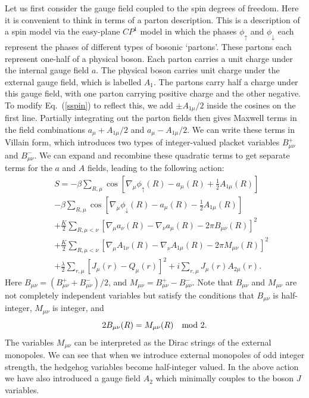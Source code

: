 \documentclass[prb,twocolumn]{revtex4-1}
\newcommand{\cp}{$CP^1$ }
\begin{document}
Let us first consider the gauge field coupled to the spin degrees of freedom. Here it is convenient to think in terms of a parton description. This is a description of a spin model via the easy-plane \cp model in which the phases $\phi_\uparrow$ and $\phi_\downarrow$ each represent the phases of different types of bosonic `partons'. These partons each represent one-half of a physical boson. Each parton carries a unit charge under the internal gauge field $a$. The physical boson carries unit charge under the external gauge field, which is labelled $A_1$. The partons carry half a charge under this gauge field, with one parton carrying positive charge and the other negative.
To modify Eq.~(\ref{sspin}) to reflect this, we add $\pm A_{1\mu}/2$ inside the cosines on the first line. 
Partially integrating out the parton fields then gives Maxwell terms in the field combinations $a_\mu+A_{1\mu}/2$ and $a_\mu-A_{1\mu}/2$. We can write these terms in Villain form, which introduces two types of integer-valued placket variables $B^+_{\mu\nu}$ and $B^-_{\mu\nu}$. We can expand and recombine these quadratic terms to get separate terms for the $a$ and $A$ fields, leading to the following action:
\begin{eqnarray}
&&S=-\beta\sum_{R,\mu} \cos[\nabla_\mu\phi_\uparrow(R)-a_\mu(R)+\frac{1}{2}A_{1\mu}(R)]\nonumber\\
&&-\beta\sum_{R,\mu} \cos[\nabla_\mu\phi_\downarrow(R)-a_\mu(R)-\frac{1}{2}A_{1\mu}(R)]\nonumber\\
&&+\frac{K}{2}\sum_{R,\mu<\nu}\left[\nabla_\mu a_\nu(R)-\nabla_\nu a_\mu(R)-2\pi B_{\mu\nu}(R)\right]^2\nonumber\\
&&+\frac{K}{2}\sum_{R,\mu<\nu}\left[\nabla_\mu A_{1\nu}(R)-\nabla_\nu A_{1\mu}(R)-2\pi M_{\mu\nu}(R)\right]^2\nonumber\\
&&+\frac{\lambda}{2}\sum_{r,\mu} [ J_\mu(r)- Q_\mu(r)]^2+i\sum_{r,\mu}J_{\mu}(r)A_{2\mu}(r).
\label{withA}
\end{eqnarray}
Here $B_{\mu\nu}=(B^+_{\mu\nu}+B^-_{\mu\nu})/2$, and $M_{\mu\nu}=B^+_{\mu\nu}-B^-_{\mu\nu}$. Note that $B_{\mu\nu}$ and $M_{\mu\nu}$ are not completely independent variables but satisfy the conditions that $B_{\mu\nu}$ is half-integer, $M_{\mu\nu}$ is integer, and 
\begin{equation}
2B_{\mu\nu}(R)=M_{\mu\nu}(R) ~~~{\rm mod}~2. 
\label{constraint}
\end{equation}
The variables $M_{\mu\nu}$ can be interpreted as the Dirac strings of the external monopoles. 
We can see that when we introduce external monopoles of odd integer strength, the hedgehog variables become half-integer valued. 
In the above action we have also introduced a gauge field $A_2$ which minimally couples to the boson $J$ variables.
\end{document}
